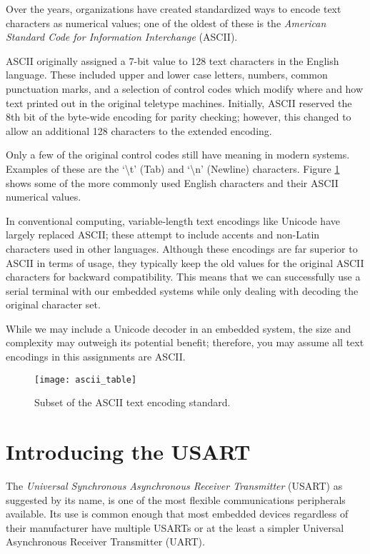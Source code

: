 \documentclass[openany,11pt,fleqn]{book} %
\begin{document}
Over the years, organizations have created standardized ways to encode text characters as numerical values; one of the oldest of these is the \textit{American Standard Code for Information Interchange} (ASCII). 

ASCII originally assigned a 7-bit value to 128 text characters in the English language. These included upper and lower case letters, numbers, common punctuation marks, and a selection of control codes which modify where and how text printed out in the original teletype machines. Initially, ASCII reserved the 8th bit of the byte-wide encoding for parity checking; however, this changed to allow an additional 128 characters to the extended encoding. 

Only a few of the original control codes still have meaning in modern systems. Examples of these are the `\textbackslash{}t' (Tab) and `\textbackslash{}n' (Newline) characters. Figure \ref{ascii_table} shows some of the more commonly used English characters and their ASCII numerical values.  

In conventional computing, variable-length text encodings like Unicode have largely replaced ASCII; these attempt to include accents and non-Latin characters used in other languages. Although these encodings are far superior to ASCII in terms of usage, they typically keep the old values for the original ASCII characters for backward compatibility. This means that we can successfully use a serial terminal with our embedded systems while only dealing with decoding the original character set.

While we may include a Unicode decoder in an embedded system, the size and complexity may outweigh its potential benefit; therefore, you may assume all text encodings in this assignments are ASCII.

\begin{figure}[]
    \centering\texttt{[image: ascii\_table]}
    \caption{Subset of the ASCII text encoding standard.}
    \label{ascii_table}
\end{figure}


\section{Introducing the USART}
The \textit{Universal Synchronous Asynchronous Receiver Transmitter} (USART) as suggested by its name, is one of the most flexible communications peripherals available. Its use is common enough that most embedded devices regardless of their manufacturer have multiple USARTs or at the least a simpler Universal Asynchronous Receiver Transmitter (UART).
\end{document}
